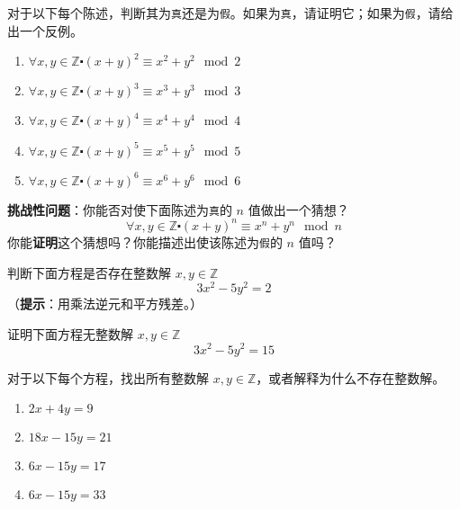 \begin{exercise}
    对于以下每个陈述，判断其为\verb|真|还是为\verb|假|。如果为\verb|真|，请证明它；如果为\verb|假|，请给出一个反例。
    \begin{enumerate}[label=(\alph*)]
        \item $\forall x, y \in \mathbb{Z} \centerdot (x + y)^2 \equiv x^2 + y^2 \mod 2$
        \item $\forall x, y \in \mathbb{Z} \centerdot (x + y)^3 \equiv x^3 + y^3 \mod 3$
        \item $\forall x, y \in \mathbb{Z} \centerdot (x + y)^4 \equiv x^4 + y^4 \mod 4$
        \item $\forall x, y \in \mathbb{Z} \centerdot (x + y)^5 \equiv x^5 + y^5 \mod 5$
        \item $\forall x, y \in \mathbb{Z} \centerdot (x + y)^6 \equiv x^6 + y^6 \mod 6$
    \end{enumerate}
    \textbf{挑战性问题}：你能否对使下面陈述为\verb|真|的 $n$ 值做出一个猜想？
    \[\forall x, y \in \mathbb{Z} \centerdot (x + y)^n \equiv x^n + y^n \mod n\]
    你能\textbf{证明}这个猜想吗？你能描述出使该陈述为\verb|假|的 $n$ 值吗？
\end{exercise}

\begin{exercise}
    判断下面方程是否存在整数解 $x, y \in \mathbb{Z}$
    \[3x^2 - 5y^2 = 2\]
    （\textbf{提示}：用乘法逆元和平方残差。）
\end{exercise}

\begin{exercise}
    证明下面方程无整数解 $x, y \in \mathbb{Z}$
    \[3x^2 - 5y^2 = 15\]
\end{exercise}

\begin{exercise}
    对于以下每个方程，找出所有整数解 $x, y \in \mathbb{Z}$，或者解释为什么不存在整数解。
    \begin{enumerate}[label=(\alph*)]
        \item $2x + 4y = 9$
        \item $18x - 15y = 21$
        \item $6x - 15y = 17$
        \item $ 6x - 15y = 33$
    \end{enumerate}
\end{exercise}

